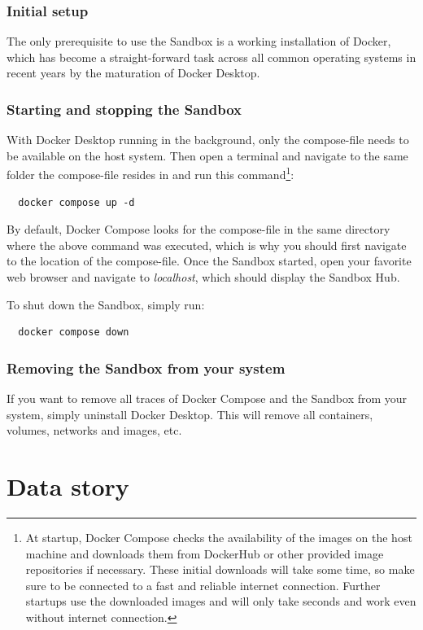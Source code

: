 \documentclass[11pt, a4paper, oneside, parskip=full-]{scrartcl}
\begin{document}
\subsubsection*{Initial setup}
The only prerequisite to use the Sandbox is a working installation of Docker,
which has become a straight-forward task across all common operating systems in
recent years by the maturation of Docker Desktop\cite{dockerdesktop}.

\subsubsection*{Starting and stopping the Sandbox}
With Docker Desktop running in the background, only the
compose-file\cite{sandboxcomposefile} needs to be available on the host system.
Then open a terminal and navigate to the same folder the compose-file resides in
and run this command\footnote{At startup, Docker Compose checks the availability
of the images on the host machine and downloads them from DockerHub or other
provided image repositories if necessary. These initial downloads will take some
time, so make sure to be connected to a fast and reliable internet connection.
Further startups use the downloaded images and will only take seconds and work
even without internet connection.}:
\begin{lstlisting}
  docker compose up -d
\end{lstlisting}

By default, Docker Compose looks for the compose-file in the same directory
where the above command was executed, which is why you should first navigate to
the location of the compose-file. Once the Sandbox started, open your favorite
web browser and navigate to \emph{localhost}, which should display the Sandbox
Hub.

To shut down the Sandbox, simply run:
\begin{lstlisting}
  docker compose down
\end{lstlisting}

\subsubsection*{Removing the Sandbox from your system}
If you want to remove all traces of Docker Compose and the Sandbox from your
system, simply uninstall Docker Desktop. This will remove all containers,
volumes, networks and images, etc.

\section{Data story}
\end{document}
